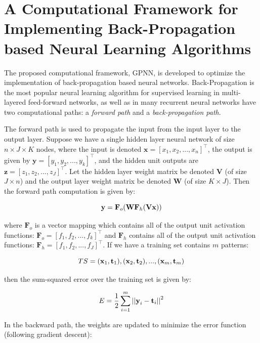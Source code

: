 \documentclass[procedia]{easychair}
\begin{document}
\section{A Computational Framework for Implementing Back-Propagation based Neural Learning Algorithms}
\label{section:implementation}

The proposed computational framework, GPNN, is developed to optimize the implementation of back-propagation based neural networks.  Back-Propagation is the most popular neural learning algorithm for supervised learning in multi-layered feed-forward networks, as well as in many recurrent neural networks have two computational paths: a \textit{forward path} and a \textit{back-propagation path}.

The forward path is used to propagate the input from the input layer to the output layer.  Suppose we have a single hidden layer neural network of size $n \times J \times K$ nodes, where the input is denoted $\textbf{x} = [x_1,x_2,...,x_n]^\top$, the output is given by $\textbf{y} = [y_1,y_2,...,y_k]^\top$, and the hidden unit outputs are $\textbf{z}=[z_1,z_2,...,z_J]^\top$.  Let the hidden layer weight matrix be denoted $\textbf{V}$ (of size $J \times n$) and the output layer weight matrix be denoted $\textbf{W}$ (of size $K \times J$).  Then the forward path computation is given by:

\begin{equation}
    \textbf{y}=\textbf{F}_o(\textbf{W}\textbf{F}_h(\textbf{Vx})) \notag
\end{equation}

where $\textbf{F}_o$ is a vector mapping which contains all of the output unit activation functions: $\textbf{F}_o=[f_1,f_2,...,f_k]^\top$ and $\textbf{F}_h$ contains all of the output unit activation functions: $\textbf{F}_h=[f_1,f_2,...,f_J]^\top$.  If we have a training set contains $m$ patterns:

\begin{equation}
    TS = {(\textbf{x}_1,\textbf{t}_1),(\textbf{x}_2,\textbf{t}_2),...,(\textbf{x}_m,\textbf{t}_m)} \notag
\end{equation}

then the sum-squared error over the training set is given by:

\begin{equation}
    E = \frac{1}{2} \sum_{i=1}^m {||\textbf{y}_i-\textbf{t}_i||}^2 \notag
\end{equation}

In the backward path, the weights are updated to minimize the error function (following gradient descent):
\end{document}
